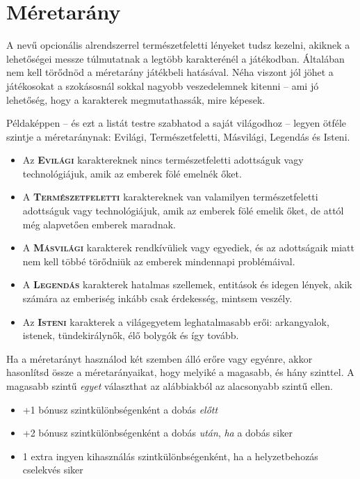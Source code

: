 \section{Méretarány}

A  nevű opcionális alrendszerrel természetfeletti lényeket tudsz kezelni, akiknek a lehetőségei messze túlmutatnak a legtöbb karakterénél a játékodban. Általában nem kell törődnöd a méretarány játékbeli hatásával. Néha viszont jól jöhet a játékosokat a szokásosnál sokkal nagyobb veszedelemnek kitenni – ami jó lehetőség, hogy a karakterek megmutathassák, mire képesek.

Példaképpen – és ezt a listát testre szabhatod a saját világodhoz – legyen ötféle szintje a méretaránynak: Evilági, Természetfeletti, Másvilági, Legendás és Isteni.

\begin{itemize}
    \item Az \textsc{\textbf{Evilági}} karaktereknek nincs természetfeletti adottságuk vagy technológiájuk, amik az emberek fölé emelnék őket.
    \item A \textsc{\textbf{Természetfeletti}} karaktereknek van valamilyen természetfeletti adottságuk vagy technológiájuk, amik az emberek fölé emelik őket, de attól még alapvetően emberek maradnak.
    \item A \textsc{\textbf{Másvilági}} karakterek rendkívüliek vagy egyediek, és az adottságaik miatt nem kell többé törődniük az emberek mindennapi problémáival.
    \item A \textsc{\textbf{Legendás}} karakterek hatalmas szellemek, entitások és idegen lények, akik számára az emberiség inkább csak érdekesség, mintsem veszély.
    \item Az \textsc{\textbf{Isteni}} karakterek a világegyetem leghatalmasabb erői: arkangyalok, istenek, tündekirálynők, élő bolygók és így tovább.
\end{itemize}

Ha a méretarányt használod két szemben álló erőre vagy egyénre, akkor hasonlítsd össze a méretarányaikat, hogy melyiké a magasabb, és hány szinttel. A magasabb szintű \emph{egyet} választhat az alábbiakból az alacsonyabb szintű ellen.

\begin{itemize}
    \item +1 bónusz szintkülönbségenként a dobás \emph{előtt}
    \item +2 bónusz szintkülönbségenként a dobás \emph{után}, \emph{ha} a dobás siker
    \item 1 extra ingyen kihasználás szintkülönbségenként, ha a helyzetbehozás cselekvés siker
\end{itemize}


